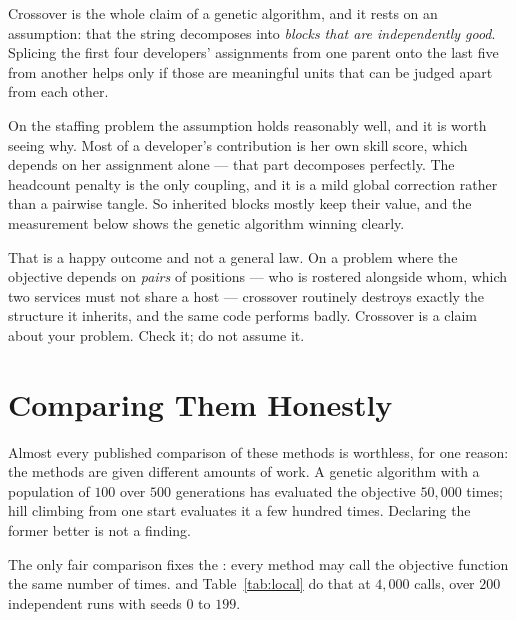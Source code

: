 \begin{conceptbox}
Crossover is the whole claim of a genetic algorithm, and it rests on an assumption:
that the string decomposes into \emph{blocks that are independently good}. Splicing
the first four developers' assignments from one parent onto the last five from
another helps only if those are meaningful units that can be judged apart from each
other.

On the staffing problem the assumption holds reasonably well, and it is worth seeing
why. Most of a developer's contribution is her own skill score, which depends on her
assignment alone --- that part decomposes perfectly. The headcount penalty is the
only coupling, and it is a mild global correction rather than a pairwise tangle. So
inherited blocks mostly keep their value, and the measurement below shows the
genetic algorithm winning clearly.

That is a happy outcome and not a general law. On a problem where the objective
depends on \emph{pairs} of positions --- who is rostered alongside whom, which two
services must not share a host --- crossover routinely destroys exactly the
structure it inherits, and the same code performs badly. Crossover is a claim about
your problem. Check it; do not assume it.
\end{conceptbox}

\section{Comparing Them Honestly}

Almost every published comparison of these methods is worthless, for one reason: the
methods are given different amounts of work. A genetic algorithm with a population
of $100$ over $500$ generations has evaluated the objective $50{,}000$ times; hill
climbing from one start evaluates it a few hundred times. Declaring the former
better is not a finding.

The only fair comparison fixes the : every method may call
the objective function the same number of times.  and
Table~\ref{tab:local} do that at $4{,}000$ calls, over $200$ independent runs with
seeds $0$ to $199$.


